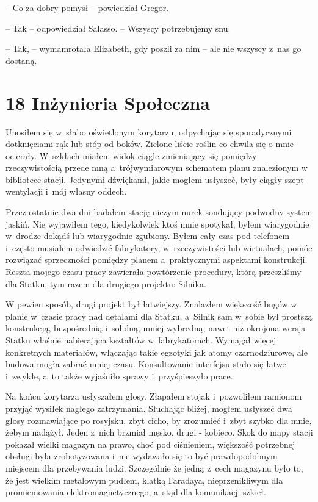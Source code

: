 \documentclass[oneside,polish,12pt,sfheadings]{mwbk}
\begin{document}
-- Co za dobry pomysł -- powiedział Gregor.

-- Tak -- odpowiedział Salasso. -- Wszyscy potrzebujemy snu.

-- Tak, -- wymamrotała Elizabeth, gdy poszli za nim -- ale nie wszyscy z~nas go dostaną.



\chapter[Inżynieria Społeczna]{18 Inżynieria Społeczna}

Unosiłem się w~słabo oświetlonym korytarzu, odpychając się sporadycznymi
dotknięciami rąk lub stóp od boków. Zielone liście roślin co chwila się
o mnie ocierały. W~szkłach miałem widok ciągle zmieniający się pomiędzy
rzeczywistością przede mną a~trójwymiarowym schematem planu znalezionym
w bibliotece stacji. Jedynymi dźwiękami, jakie mogłem usłyszeć, były
ciągły szept wentylacji i~mój własny oddech.

Przez ostatnie dwa dni badałem stację niczym nurek sondujący podwodny
system jaskiń. Nie wyjawiłem tego, kiedykolwiek ktoś mnie spotykał,
byłem wiarygodnie w~drodze dokądś lub wiarygodnie zgubiony. Byłem cały
czas pod telefonem i~często musiałem odwiedzić fabrykatory, w~rzeczywistości lub wirtualach, pomóc rozwiązać sprzeczności pomiędzy
planem a~praktycznymi aspektami konstrukcji. Reszta mojego czasu pracy
zawierała powtórzenie procedury, którą przeszliśmy dla Statku, tym razem
dla drugiego projektu: Silnika.

W pewien sposób, drugi projekt był łatwiejszy. Znalazłem większość bugów
w planie w~czasie pracy nad detalami dla Statku, a~Silnik sam w~sobie
był prostszą konstrukcją, bezpośrednią i~solidną, mniej wybredną, nawet
niż okrojona wersja Statku właśnie nabierająca kształtów w~fabrykatorach. Wymagał więcej konkretnych materiałów, włączając takie
egzotyki jak atomy czarnodziurowe, ale budowa mogła zabrać mniej czasu.
Konsultowanie interfejsu stało się łatwe i~zwykłe, a~to także wyjaśniło
sprawy i~przyśpieszyło prace.

Na końcu korytarza usłyszałem głosy. Złapałem stojak i~pozwoliłem
ramionom przyjąć wysiłek nagłego zatrzymania. Słuchając bliżej, mogłem
usłyszeć dwa głosy rozmawiające po rosyjsku, zbyt cicho, by zrozumieć i~zbyt szybko dla mnie, żebym nadążył. Jeden z~nich brzmiał męsko, drugi -
kobieco. Skok do mapy stacji pokazał wielki magazyn na prawo, choć pod
ciśnieniem, większość potrzebnej obsługi była zrobotyzowana i~nie
wydawało się to być prawdopodobnym miejscem dla przebywania ludzi.
Szczególnie że jedną z~cech magazynu było to, że jest wielkim metalowym
pudłem, klatką Faradaya, nieprzenikliwym dla promieniowania
elektromagnetycznego, a~stąd dla komunikacji szkieł.
\end{document}
